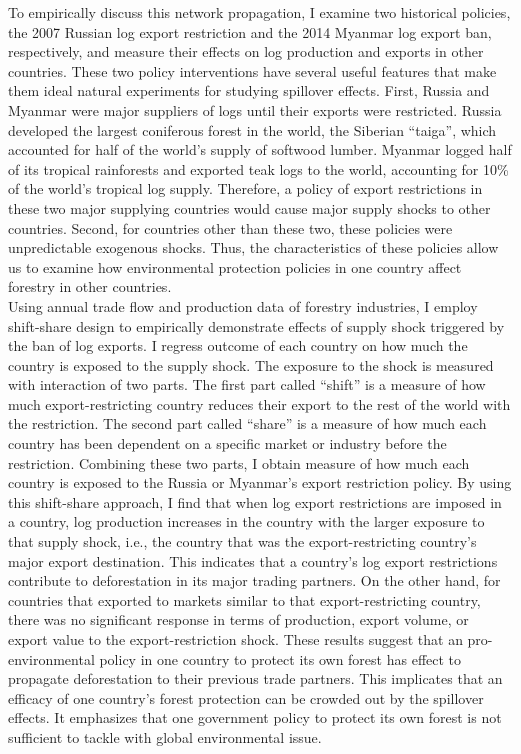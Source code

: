 \documentclass[a4paper,12pt]{article}
\begin{document}
To empirically discuss this network propagation, I examine two historical policies, the 2007 Russian log export restriction and the 2014 Myanmar log export ban, respectively, and measure their effects on log production and exports in other countries. These two policy interventions have several useful features that make them ideal natural experiments for studying spillover effects. First, Russia and Myanmar were major suppliers of logs until their exports were restricted. Russia developed the largest coniferous forest in the world, the Siberian ``taiga'', which accounted for half of the world's supply of softwood lumber. Myanmar logged half of its tropical rainforests and exported teak logs to the world, accounting for 10\% of the world's tropical log supply. Therefore, a policy of export restrictions in these two major supplying countries would cause major supply shocks to other countries. Second, for countries other than these two, these policies were unpredictable exogenous shocks. Thus, the characteristics of these policies allow us to examine how environmental protection policies in one country affect forestry in other countries.\\

Using annual trade flow and production data of forestry industries, I employ shift-share design to empirically demonstrate effects of supply shock triggered by the ban of log exports. I regress outcome of each country on how much the country is exposed to the supply shock. The exposure to the shock is measured with interaction of two parts. The first part called ``shift'' is a measure of how much export-restricting country reduces their export to the rest of the world with the restriction. The second part called ``share'' is a measure of how much each country has been dependent on a specific market or industry before the restriction. Combining these two parts, I obtain measure of how much each country is exposed to the Russia or Myanmar's export restriction policy. By using this shift-share approach, I find that when log export restrictions are imposed in a country, log production increases in the country with the larger exposure to that supply shock, i.e., the country that was the export-restricting country's major export destination. This indicates that a country's log export restrictions contribute to deforestation in its major trading partners. On the other hand, for countries that exported to markets similar to that export-restricting country, there was no significant response in terms of production, export volume, or export value to the export-restriction shock. These results suggest that an pro-environmental policy in one country to protect its own forest has effect to propagate deforestation to their previous trade partners. This implicates that an efficacy of one country's forest protection can be crowded out by the spillover effects. It emphasizes that one government policy to protect its own forest is not sufficient to tackle with global environmental issue.\\
\end{document}
